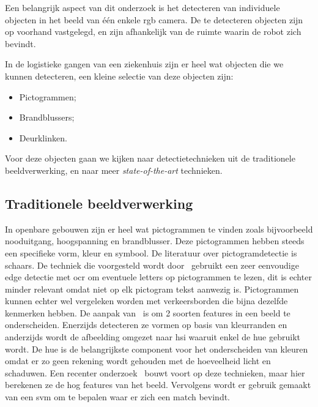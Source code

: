         Een belangrijk aspect van dit onderzoek is het detecteren van individuele objecten in het beeld van \'{e}\'{e}n enkele \gls{rgb} camera.
        De te detecteren objecten zijn op voorhand vastgelegd, en zijn afhankelijk van de ruimte waarin de robot zich bevindt.

        In de logistieke gangen van een ziekenhuis zijn er heel wat objecten die we kunnen detecteren, een kleine selectie van deze objecten zijn:

        \begin{itemize}
            \item Pictogrammen;
            \item Brandblussers;
            \item Deurklinken.
        \end{itemize}

        Voor deze objecten gaan we kijken naar detectietechnieken uit de traditionele beeldverwerking, en naar meer \textit{state-of-the-art} technieken.


        \subsection{Traditionele beeldverwerking} \label{sec:trad_obj_det}
            In openbare gebouwen zijn er heel wat pictogrammen te vinden zoals bijvoorbeeld nooduitgang, hoogspanning en brandblusser. Deze pictogrammen hebben steeds een specifieke vorm, kleur en symbool.
            De literatuur over pictogramdetectie is schaars. De techniek die voorgesteld wordt door~\cite{swathika2016} gebruikt een zeer eenvoudige edge detectie met \gls{ocr} om eventuele letters op pictogrammen te lezen, dit is echter minder relevant omdat niet op elk pictogram tekst aanwezig is. Pictogrammen kunnen echter wel vergeleken worden met verkeersborden die bijna dezelfde kenmerken hebben.
            De aanpak van~\cite{Fang2003} is om 2 soorten features in een beeld te onderscheiden. Enerzijds detecteren ze vormen op basis van kleurranden en anderzijds wordt de
            afbeelding omgezet naar \gls{hsi} waaruit enkel de hue gebruikt wordt. De hue is de belangrijkste component voor het onderscheiden van kleuren omdat er zo geen rekening wordt gehouden
            met de hoeveelheid licht en schaduwen.
            Een recenter onderzoek~\cite{Zabihi2017} bouwt voort op deze technieken, maar hier berekenen ze de \gls{hog} features van het beeld.
            Vervolgens wordt er gebruik gemaakt van een \gls{svm} om te bepalen waar er zich een match bevindt.

